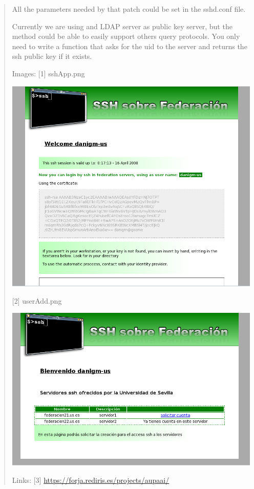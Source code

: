 \begin{quote}
    All the parameters needed by that patch could be set in the
    sshd.conf file.

    Currently we are using and LDAP server as public key server, but the
    method could be able to easily support others query protocols. You only need
    to write a function that asks for the uid to the server and
    returns the ssh public key if it exists.

Images:
    [1] sshApp.png
        \begin{center}
            \includegraphics[width=\textwidth]{img/sshApp.png}
        \end{center}
    [2] userAdd.png
        \begin{center}
            \includegraphics[width=\textwidth]{img/userAdd.png}
        \end{center}
Links:
    [3] \url{https://forja.rediris.es/projects/aupaai/}

    \end{quote}

